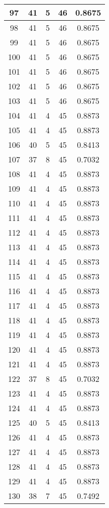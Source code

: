 \documentclass[letterpaper, 12pt]{article}
\begin{document}
\begin{longtable}{|c|c|c|c|c|}
\hline
97 & 41 & 5 & 46 & 0.8675 \\
\hline
98 & 41 & 5 & 46 & 0.8675 \\
\hline
99 & 41 & 5 & 46 & 0.8675 \\
\hline
100 & 41 & 5 & 46 & 0.8675 \\
\hline
101 & 41 & 5 & 46 & 0.8675 \\
\hline
102 & 41 & 5 & 46 & 0.8675 \\
\hline
103 & 41 & 5 & 46 & 0.8675 \\
\hline
104 & 41 & 4 & 45 & 0.8873 \\
\hline
105 & 41 & 4 & 45 & 0.8873 \\
\hline
106 & 40 & 5 & 45 & 0.8413 \\
\hline
107 & 37 & 8 & 45 & 0.7032 \\
\hline
108 & 41 & 4 & 45 & 0.8873 \\
\hline
109 & 41 & 4 & 45 & 0.8873 \\
\hline
110 & 41 & 4 & 45 & 0.8873 \\
\hline
111 & 41 & 4 & 45 & 0.8873 \\
\hline
112 & 41 & 4 & 45 & 0.8873 \\
\hline
113 & 41 & 4 & 45 & 0.8873 \\
\hline
114 & 41 & 4 & 45 & 0.8873 \\
\hline
115 & 41 & 4 & 45 & 0.8873 \\
\hline
116 & 41 & 4 & 45 & 0.8873 \\
\hline
117 & 41 & 4 & 45 & 0.8873 \\
\hline
118 & 41 & 4 & 45 & 0.8873 \\
\hline
119 & 41 & 4 & 45 & 0.8873 \\
\hline
120 & 41 & 4 & 45 & 0.8873 \\
\hline
121 & 41 & 4 & 45 & 0.8873 \\
\hline
122 & 37 & 8 & 45 & 0.7032 \\
\hline
123 & 41 & 4 & 45 & 0.8873 \\
\hline
124 & 41 & 4 & 45 & 0.8873 \\
\hline
125 & 40 & 5 & 45 & 0.8413 \\
\hline
126 & 41 & 4 & 45 & 0.8873 \\
\hline
127 & 41 & 4 & 45 & 0.8873 \\
\hline
128 & 41 & 4 & 45 & 0.8873 \\
\hline
129 & 41 & 4 & 45 & 0.8873 \\
\hline
130 & 38 & 7 & 45 & 0.7492 \\

\end{longtable}
\end{document}
